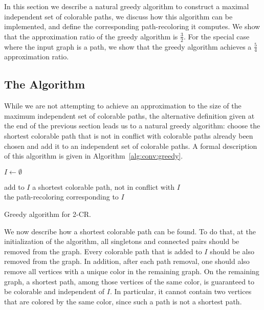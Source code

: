 \label{sec:greedy}

In this section we describe a natural greedy algorithm to construct a maximal
independent set of colorable paths, we discuss how this algorithm can be implemented,
and define the corresponding path-recoloring it computes.
%
We show that the approximation ratio of the greedy algorithm is $\frac{3}{2}$.
%
For the special case where the input graph is a path, 
we show that the greedy algorithm achieves a $\frac{5}{4}$ approximation ratio.


\subsection{The Algorithm}

While we are not attempting to achieve an approximation to the size
of the maximum independent set of colorable paths,
the alternative definition given at the end of the previous section
leads us to a natural greedy algorithm: 
choose the shortest colorable path that 
is not in conflict with colorable paths already been chosen and add it
to an independent set of colorable paths.
%
A formal description of this algorithm is given in
Algorithm~\ref{alg:conv:greedy}.

\begin{algorithm}
\begin{algorithmic}

\State $I \gets \emptyset$

\State add to $I$ a shortest colorable path, not in conflict with $I$ 
\EndWhile
\\
\Return the path-recoloring corresponding to $I$


\end{algorithmic}
\caption{Greedy algorithm for 2-CR.}
\label{alg:conv:greedy}
\end{algorithm}

We now describe how a shortest colorable path can be found.
%
To do that, 
at the initialization of the algorithm, 
all singletons and connected pairs should be removed from the graph.  
%
Every colorable path that is added to $I$ should be also removed from the graph.  
%
In addition, 
after each path removal, 
one should also remove all vertices with a unique color in the remaining graph.  
%
On the remaining graph, 
a shortest path, 
among those vertices of the same color, 
is guaranteed to be colorable and independent of $I$.
%
In particular,
it cannot contain two vertices that are colored by the same color, 
since such a path is not a shortest path.

